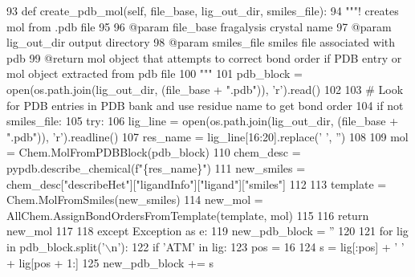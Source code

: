\begin{DoxyCode}
93     \textcolor{keyword}{def }create\_pdb\_mol(self, file\_base, lig\_out\_dir, smiles\_file):
94         \textcolor{stringliteral}{"""! creates mol from .pdb file}
95 \textcolor{stringliteral}{}
96 \textcolor{stringliteral}{        @param file\_base fragalysis crystal name}
97 \textcolor{stringliteral}{        @param lig\_out\_dir output directory}
98 \textcolor{stringliteral}{        @param smiles\_file smiles file associated with pdb}
99 \textcolor{stringliteral}{        @return mol object that attempts to correct bond order if PDB entry or mol object extracted from
       pdb file}
100 \textcolor{stringliteral}{        """}
101         pdb\_block = open(os.path.join(lig\_out\_dir, (file\_base + \textcolor{stringliteral}{".pdb"})), \textcolor{stringliteral}{'r').read()}
102 \textcolor{stringliteral}{}
103 \textcolor{stringliteral}{        }\textcolor{comment}{# Look for PDB entries in PDB bank and use residue name to get bond order}
104         \textcolor{keywordflow}{if} \textcolor{keywordflow}{not} smiles\_file:
105             \textcolor{keywordflow}{try}:
106                 lig\_line = open(os.path.join(lig\_out\_dir, (file\_base + \textcolor{stringliteral}{".pdb"})), \textcolor{stringliteral}{'r').readline()}
107 \textcolor{stringliteral}{                res\_name = lig\_line[16:20].replace(' '}, \textcolor{stringliteral}{''})
108 
109                 mol = Chem.MolFromPDBBlock(pdb\_block)
110                 chem\_desc = pypdb.describe\_chemical(f\textcolor{stringliteral}{"\{res\_name\}"})
111                 new\_smiles = chem\_desc[\textcolor{stringliteral}{"describeHet"}][\textcolor{stringliteral}{"ligandInfo"}][\textcolor{stringliteral}{"ligand"}][\textcolor{stringliteral}{"smiles"}]
112 
113                 template = Chem.MolFromSmiles(new\_smiles)
114                 new\_mol = AllChem.AssignBondOrdersFromTemplate(template, mol)
115 
116                 \textcolor{keywordflow}{return} new\_mol
117 
118             \textcolor{keywordflow}{except} Exception \textcolor{keyword}{as} e:
119                 new\_pdb\_block = \textcolor{stringliteral}{''}
120 
121                 \textcolor{keywordflow}{for} lig \textcolor{keywordflow}{in} pdb\_block.split(\textcolor{stringliteral}{'\(\backslash\)n'}):
122                     \textcolor{keywordflow}{if} \textcolor{stringliteral}{'ATM'} \textcolor{keywordflow}{in} lig:
123                         pos = 16
124                         s = lig[:pos] + \textcolor{stringliteral}{' '} + lig[pos + 1:]
125                         new\_pdb\_block += s

\end{DoxyCode}
